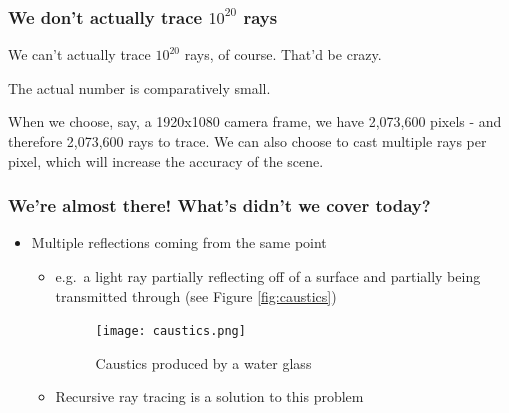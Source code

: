 \documentclass[12pt]{beamer}
\begin{document}
  \begin{frame}
    \frametitle{We don't actually trace $10^{20}$ rays}

    We can't actually trace $10^{20}$ rays, of course.
    That'd be crazy.

    \hfill

    The actual number is comparatively small.

    \hfill

    When we choose, say, a 1920x1080 camera frame, we have 2,073,600 pixels - and therefore 2,073,600 rays to trace.
    We can also choose to cast multiple rays per pixel, which will increase the accuracy of the scene.


  \end{frame}

  \begin{frame}
    \frametitle{We're almost there! What's didn't we cover today?}

    \begin{itemize}
      \item Multiple reflections coming from the same point
      \begin{itemize}
        \item e.g.\ a light ray partially reflecting off of a surface and partially being transmitted through (see Figure \autoref{fig:caustics})

        \begin{figure}
          \centering
          \texttt{[image: caustics.png]}
          \caption{Caustics produced by a water glass}
          \label{fig:caustics}
        \end{figure}

        \item Recursive ray tracing is a solution to this problem

      \end{itemize}

    \end{itemize}

  \end{frame}
\end{document}
